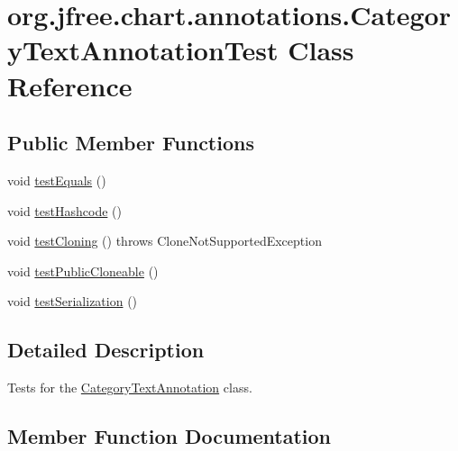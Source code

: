 \hypertarget{classorg_1_1jfree_1_1chart_1_1annotations_1_1_category_text_annotation_test}{}\section{org.\+jfree.\+chart.\+annotations.\+Category\+Text\+Annotation\+Test Class Reference}
\label{classorg_1_1jfree_1_1chart_1_1annotations_1_1_category_text_annotation_test}
\subsection*{Public Member Functions}
\begin{DoxyCompactItemize}
\item 
void \mbox{\hyperlink{classorg_1_1jfree_1_1chart_1_1annotations_1_1_category_text_annotation_test_acc726f9d77913097b7d9cda5786bc973}{test\+Equals}} ()
\item 
void \mbox{\hyperlink{classorg_1_1jfree_1_1chart_1_1annotations_1_1_category_text_annotation_test_acf82e3bd2a61dcde042d9302c41e2649}{test\+Hashcode}} ()
\item 
void \mbox{\hyperlink{classorg_1_1jfree_1_1chart_1_1annotations_1_1_category_text_annotation_test_a6b731f997d3cc15dce3354eddfeb3443}{test\+Cloning}} ()  throws Clone\+Not\+Supported\+Exception 
\item 
void \mbox{\hyperlink{classorg_1_1jfree_1_1chart_1_1annotations_1_1_category_text_annotation_test_add3bb60630ac1830eeedb7873c517e14}{test\+Public\+Cloneable}} ()
\item 
void \mbox{\hyperlink{classorg_1_1jfree_1_1chart_1_1annotations_1_1_category_text_annotation_test_aea50b3687596edbf050e51de75fd1c3a}{test\+Serialization}} ()
\end{DoxyCompactItemize}


\subsection{Detailed Description}
Tests for the \mbox{\hyperlink{classorg_1_1jfree_1_1chart_1_1annotations_1_1_category_text_annotation}{Category\+Text\+Annotation}} class. 

\subsection{Member Function Documentation}
\mbox{\label{classorg_1_1jfree_1_1chart_1_1annotations_1_1_category_text_annotation_test_a6b731f997d3cc15dce3354eddfeb3443}} 
